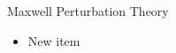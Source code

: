 \begin{frame}{Maxwell Perturbation Theory}
\label{fr:intro_mpt}

\begin{itemize}
\item New item
\end{itemize}


\end{frame}
